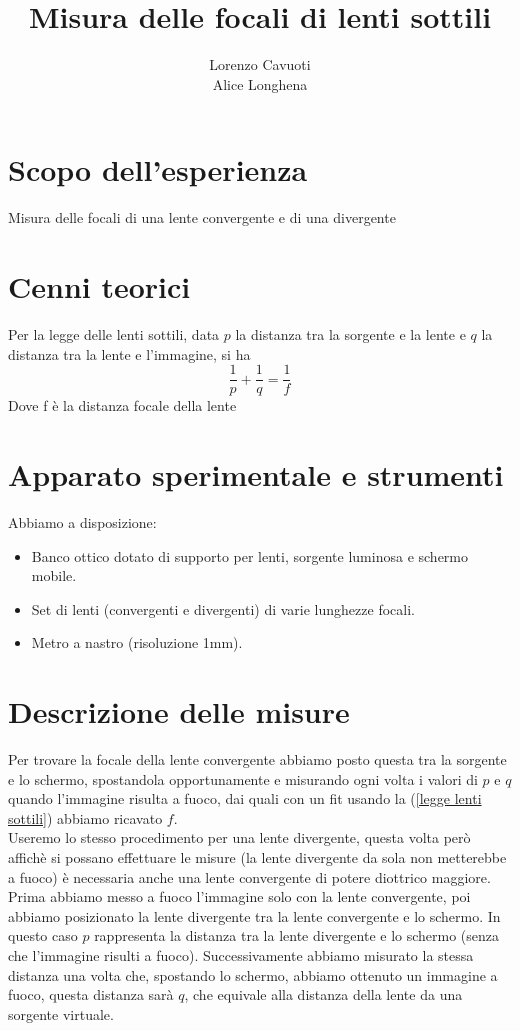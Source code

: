 \documentclass{article}
\title{Misura delle focali di lenti sottili}
\author{Lorenzo Cavuoti \\ Alice Longhena}
\begin{document}
	\maketitle
	
	\section{Scopo dell'esperienza}
		Misura delle focali di una lente convergente e di una divergente
	
	\section{Cenni teorici}
		Per la legge delle lenti sottili, data $p$ la distanza tra la sorgente e la lente e $q$ la distanza tra la lente e l'immagine, si ha
		\begin{equation}
			\frac{1}{p} + \frac{1}{q} = \frac{1}{f}
			\label{legge lenti sottili}
		\end{equation}
		Dove f \`{e} la distanza focale della lente
	
	\section{Apparato sperimentale e strumenti}
		Abbiamo a disposizione:
		\begin{itemize}
		\item Banco ottico dotato di supporto per lenti, sorgente luminosa e schermo mobile.
		\item Set di lenti (convergenti e divergenti) di varie lunghezze focali.
		\item Metro a nastro (risoluzione 1mm).
		\end{itemize}
	
	\section{Descrizione delle misure}
		Per trovare la focale della lente convergente abbiamo posto questa tra la sorgente e lo schermo, spostandola opportunamente e misurando ogni volta i valori di $p$ e $q$ quando l'immagine risulta a fuoco, dai quali con un fit usando la (\ref{legge lenti sottili}) abbiamo ricavato $f$.\\
		Useremo lo stesso procedimento per una lente divergente, questa volta per\`{o} affich\`{e} si possano effettuare le misure (la lente divergente da sola non metterebbe a fuoco) \`{e} necessaria anche una lente convergente di potere diottrico maggiore.
		Prima abbiamo messo a fuoco l'immagine solo con la lente convergente, poi abbiamo posizionato la lente divergente tra la lente convergente e lo schermo. In questo caso $p$ rappresenta la distanza tra la lente divergente e lo schermo (senza che l'immagine risulti a fuoco). Successivamente abbiamo misurato la stessa distanza una volta che, spostando lo schermo, abbiamo ottenuto un immagine a fuoco, questa distanza sar\`{a} $q$, che equivale alla distanza della lente da una sorgente virtuale.
		
\end{document}
